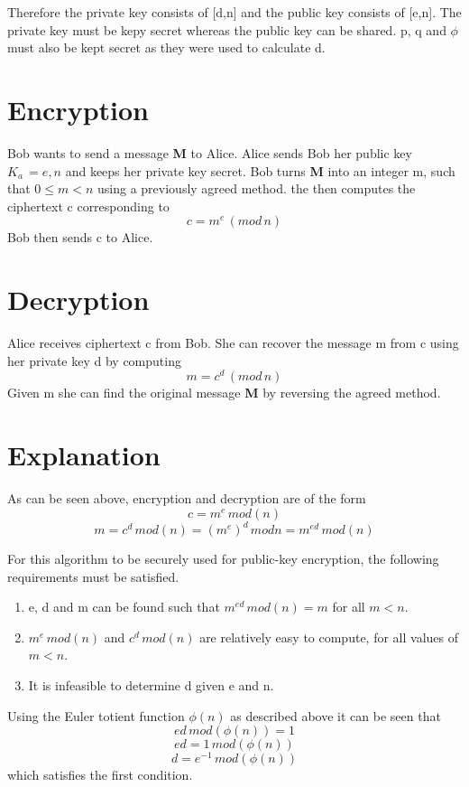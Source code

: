 \documentclass[a4paper,11pt]{article}
\begin{document}
Therefore the private key consists of [d,n] and the public key consists of [e,n]. The private key must be kepy secret whereas the public key can be shared. p, q and $ \phi $ must also be kept secret as they were used to calculate d.

\section{Encryption}

Bob wants to send a message \textbf{M} to Alice. Alice sends Bob her public key $ K_{a} \, = {e,n} $ and keeps her private key secret. Bob turns \textbf{M} into an integer m, such that $ 0 \leq m < n $ using a previously agreed method. the then computes the ciphertext c corresponding to
\[ c = m^{e} \, (mod \, n) \]
Bob then sends c to Alice.

\section{Decryption}

Alice receives ciphertext c from Bob. She can recover the message m from c using her private key d by computing
\[ m = c^{d} \, (mod \, n) \]
Given m she can find the original message \textbf{M} by reversing the agreed method.

\section{Explanation}

As can be seen above, encryption and decryption are of the form
\[ c = m^{e} \, mod(n) \]
\[ m = c^{d} \, mod(n) = (m^{e})^{d} \, mod n = m^{ed} \, mod(n)\]

For this algorithm to be securely used for public-key encryption, the following requirements must be satisfied.
\begin{enumerate}
  \item e, d and m can be found such that $ m^{ed} \, mod(n) = m $ for all $ m < n $.
  \item $ m^{e} \, mod(n) $ and $ c^{d} \, mod(n) $ are relatively easy to compute, for all values of $ m < n $.
  \item It is infeasible to determine d given e and n.
\end{enumerate}

Using the Euler totient function $ \phi (n) $ as described above it can be seen that
\[ ed \, mod (\phi(n)) = 1 \]
\[ ed = 1 \, mod(\phi(n)) \]
\[ d = e^{-1} \, mod(\phi(n)) \]
which satisfies the first condition. 
\end{document}
